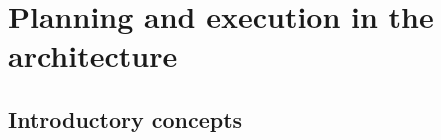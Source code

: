 \section{Planning and execution in the \rx architecture}
\label{sec:arch}


\subsection{Introductory concepts}
\label{sec:arch:intro}

